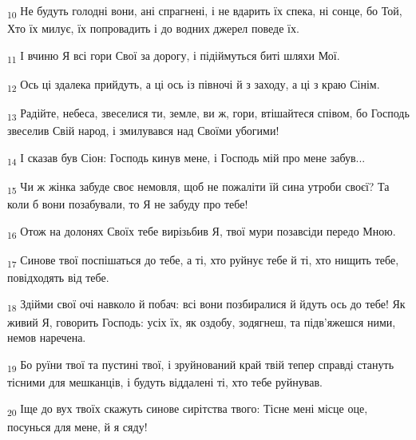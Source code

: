 \begin{tcolorbox}
\textsubscript{10} Не будуть голодні вони, ані спрагнені, і не вдарить їх спека, ні сонце, бо Той, Хто їх милує, їх попровадить і до водних джерел поведе їх.
\end{tcolorbox}
\begin{tcolorbox}
\textsubscript{11} І вчиню Я всі гори Свої за дорогу, і підіймуться биті шляхи Мої.
\end{tcolorbox}
\begin{tcolorbox}
\textsubscript{12} Ось ці здалека прийдуть, а ці ось із півночі й з заходу, а ці з краю Сінім.
\end{tcolorbox}
\begin{tcolorbox}
\textsubscript{13} Радійте, небеса, звеселися ти, земле, ви ж, гори, втішайтеся співом, бо Господь звеселив Свій народ, і змилувався над Своїми убогими!
\end{tcolorbox}
\begin{tcolorbox}
\textsubscript{14} І сказав був Сіон: Господь кинув мене, і Господь мій про мене забув...
\end{tcolorbox}
\begin{tcolorbox}
\textsubscript{15} Чи ж жінка забуде своє немовля, щоб не пожаліти їй сина утроби своєї? Та коли б вони позабували, то Я не забуду про тебе!
\end{tcolorbox}
\begin{tcolorbox}
\textsubscript{16} Отож на долонях Своїх тебе вирізьбив Я, твої мури позавсіди передо Мною.
\end{tcolorbox}
\begin{tcolorbox}
\textsubscript{17} Синове твої поспішаться до тебе, а ті, хто руйнує тебе й ті, хто нищить тебе, повідходять від тебе.
\end{tcolorbox}
\begin{tcolorbox}
\textsubscript{18} Здійми свої очі навколо й побач: всі вони позбиралися й йдуть ось до тебе! Як живий Я, говорить Господь: усіх їх, як оздобу, зодягнеш, та підв'яжешся ними, немов наречена.
\end{tcolorbox}
\begin{tcolorbox}
\textsubscript{19} Бо руїни твої та пустині твої, і зруйнований край твій тепер справді стануть тісними для мешканців, і будуть віддалені ті, хто тебе руйнував.
\end{tcolorbox}
\begin{tcolorbox}
\textsubscript{20} Іще до вух твоїх скажуть синове сирітства твого: Тісне мені місце оце, посунься для мене, й я сяду!
\end{tcolorbox}
